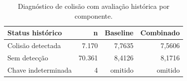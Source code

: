 \begin{table}[!htbp]\centering\small
\caption{Diagnóstico de colisão com avaliação histórica por componente.}
\begin{tabularx}{\linewidth}{Xrrr}
\toprule
Status histórico & n & Baseline & Combinado \\
\midrule
Colisão detectada & 7.170 & 7,7635 & 7,5606 \\
Sem detecção & 70.361 & 8,4126 & 8,1716 \\
Chave indeterminada & 4 & omitido & omitido \\
\bottomrule\end{tabularx}
\par{}
\end{table}
